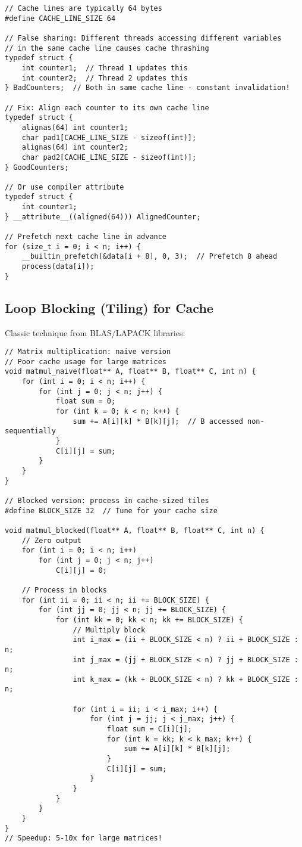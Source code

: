 \begin{lstlisting}
// Cache lines are typically 64 bytes
#define CACHE_LINE_SIZE 64

// False sharing: Different threads accessing different variables
// in the same cache line causes cache thrashing
typedef struct {
    int counter1;  // Thread 1 updates this
    int counter2;  // Thread 2 updates this
} BadCounters;  // Both in same cache line - constant invalidation!

// Fix: Align each counter to its own cache line
typedef struct {
    alignas(64) int counter1;
    char pad1[CACHE_LINE_SIZE - sizeof(int)];
    alignas(64) int counter2;
    char pad2[CACHE_LINE_SIZE - sizeof(int)];
} GoodCounters;

// Or use compiler attribute
typedef struct {
    int counter1;
} __attribute__((aligned(64))) AlignedCounter;

// Prefetch next cache line in advance
for (size_t i = 0; i < n; i++) {
    __builtin_prefetch(&data[i + 8], 0, 3);  // Prefetch 8 ahead
    process(data[i]);
}
\end{lstlisting}

\subsection{Loop Blocking (Tiling) for Cache}

Classic technique from BLAS/LAPACK libraries:

\begin{lstlisting}
// Matrix multiplication: naive version
// Poor cache usage for large matrices
void matmul_naive(float** A, float** B, float** C, int n) {
    for (int i = 0; i < n; i++) {
        for (int j = 0; j < n; j++) {
            float sum = 0;
            for (int k = 0; k < n; k++) {
                sum += A[i][k] * B[k][j];  // B accessed non-sequentially
            }
            C[i][j] = sum;
        }
    }
}

// Blocked version: process in cache-sized tiles
#define BLOCK_SIZE 32  // Tune for your cache size

void matmul_blocked(float** A, float** B, float** C, int n) {
    // Zero output
    for (int i = 0; i < n; i++)
        for (int j = 0; j < n; j++)
            C[i][j] = 0;

    // Process in blocks
    for (int ii = 0; ii < n; ii += BLOCK_SIZE) {
        for (int jj = 0; jj < n; jj += BLOCK_SIZE) {
            for (int kk = 0; kk < n; kk += BLOCK_SIZE) {
                // Multiply block
                int i_max = (ii + BLOCK_SIZE < n) ? ii + BLOCK_SIZE : n;
                int j_max = (jj + BLOCK_SIZE < n) ? jj + BLOCK_SIZE : n;
                int k_max = (kk + BLOCK_SIZE < n) ? kk + BLOCK_SIZE : n;

                for (int i = ii; i < i_max; i++) {
                    for (int j = jj; j < j_max; j++) {
                        float sum = C[i][j];
                        for (int k = kk; k < k_max; k++) {
                            sum += A[i][k] * B[k][j];
                        }
                        C[i][j] = sum;
                    }
                }
            }
        }
    }
}
// Speedup: 5-10x for large matrices!
\end{lstlisting}

